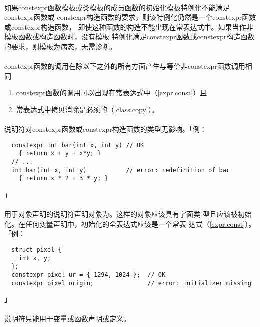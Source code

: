 \paragraph{}
如果constexpr函数模板或类模板的成员函数的初始化模板特例化不能满足constexpr函数或
constexpr构造函数的要求，则该特例化仍然是一个constexpr函数或constexpr构造函数，
即使这种函数的构造不能出现在常表达式中。如果当作非模板函数或构造函数时，没有模板
特例化满足constexpr函数或constexpr构造函数的要求，则模板为病态，无需诊断。

\paragraph{}
constexpr函数的调用在除以下之外的所有方面产生与等价非constexpr函数调用相同
\begin{enumerate}
  \item{constexpr函数的调用可以出现在常表达式中（\ref{expr.const}）且}
  \item{常表达式中拷贝消除是必须的（\ref{class.copy}）。}
\end{enumerate}

\paragraph{}
说明符对constexpr函数或constexpr构造函数的类型无影响。「例：
\begin{lstlisting}
  constexpr int bar(int x, int y) // OK
    { return x + y + x*y; }
  // ...
  int bar(int x, int y)           // error: redefinition of bar
    { return x * 2 + 3 * y; }
\end{lstlisting}」

\paragraph{}
用于对象声明的说明符声明对象为。这样的对象应该具有字面类
型且应该被初始化。在任何变量声明中，初始化的全表达式应该是一个常表
达式（\ref{expr.const}）。「例：
\begin{lstlisting}
  struct pixel {
    int x, y;
  };
  constexpr pixel ur = { 1294, 1024 };  // OK
  constexpr pixel origin;               // error: initializer missing
\end{lstlisting}」

\paragraph{}
说明符只能用于变量或函数声明或定义。

